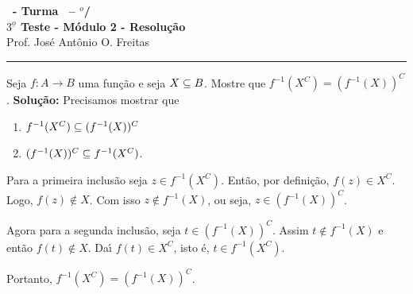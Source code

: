 \documentclass[12pt]{exam}
\begin{document}
\begin{center}
{\Large\bf \disciplina\ - Turma \turma\ -- \semestre$^{o}$/\ano} \\ \vspace{9pt} {\large\bf
$3^{\underline{o}}$ Teste - M\'odulo 2 - Resolu\c{c}\~ao}\\
\vspace{9pt} Prof. Jos{\'e} Ant{\^o}nio O. Freitas
\end{center}
\hrule

\vspace{.6cm}

\questao Seja $f : A \to B$ uma fun{\c c}{\~a}o e seja $X \subseteq B$. Mostre que $f^{-1}(X^C) = (f^{-1}(X))^C$.
\noindent\textbf{Solu\c{c}\~ao:} Precisamos mostrar que
\begin{enumerate}[label={\roman*})]
    \item $f^{-1}(X^C) \subseteq (f^{-1}(X))^C$
    \item $(f^{-1}(X))^C \subseteq f^{-1}(X^C)$.
\end{enumerate}

Para a primeira inclus\~ao seja $z \in f^{-1}(X^C)$. Ent\~ao, por defini\c{c}\~ao, $f(z) \in X^C$. Logo, $f(z) \notin X$. Com isso $z \notin f^{-1}(X)$, ou seja, $z \in (f^{-1}(X))^C$.

Agora para a segunda inclus\~ao, seja $t \in (f^{-1}(X))^C$. Assim $t \notin f^{-1}(X)$ e ent\~ao $f(t) \notin X$. Da{\'\i} $f(t) \in X^C$, isto \'e, $t \in f^{-1}(X^C)$.

Portanto, $f^{-1}(X^C) = (f^{-1}(X))^C$.


\vspace{.5cm}
\end{document}
